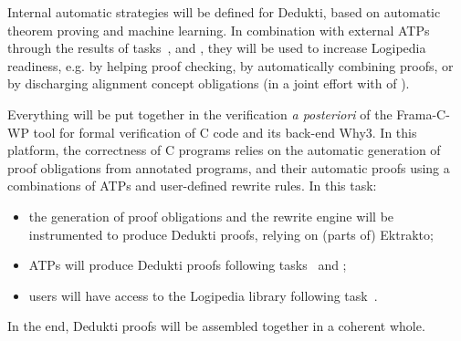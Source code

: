 \begin{workpackage}
\begin{tasklist}
  \begin{task}[id=readiness,
      title=ATPs to increase Logipedia readiness,
      lead=Inn,
      SacRM=4,
      InnRM=6,
      BelRM=3
    ]

    Internal automatic strategies will be defined for Dedukti, based on
    automatic theorem proving and machine learning. In combination with
    external ATPs through the results of
    tasks~,
     and ,
    they will be used to increase Logipedia readiness, e.g. by helping
    proof checking, by automatically combining proofs, or by discharging
    alignment concept obligations (in a joint effort with
     of ).




\end{task}


\begin{task}[id=cooperation,
    title=Logipedia and ATP end-to-end,
    lead=Cea,
    CeaRM=18]

    Everything will be put together in the verification {\em a
      posteriori} of the Frama-C-WP tool for formal verification of C
    code and its back-end Why3. In this platform, the correctness of C
    programs relies on the automatic generation of proof obligations
    from annotated programs, and their automatic proofs using a
    combinations of ATPs and user-defined rewrite rules. In this task:
    \begin{itemize}
    \item the generation of proof obligations and the rewrite engine
      will be instrumented to produce Dedukti proofs, relying on (parts
      of) Ektrakto;
    \item ATPs will produce Dedukti proofs following
      tasks~ and
      ;
    \item users will have access to the Logipedia library following
      task~.
    \end{itemize}
    In the end, Dedukti proofs will be assembled together in a coherent
    whole.


\end{task}
\end{tasklist}
\end{workpackage}
